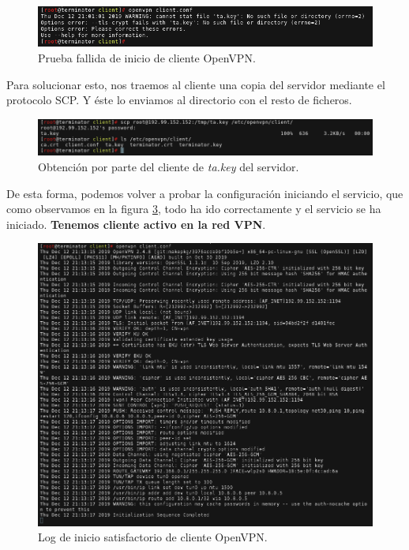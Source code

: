 \documentclass[a4paper, 11pt, titlepage]{article}
\begin{document}
        \begin{figure}[htp]
            \centering
            \includegraphics[width=1\textwidth]{resources/openvpn12.png}
            \caption{Prueba fallida de inicio de cliente OpenVPN.}
            \label{openvpn12}
        \end{figure}   

        Para solucionar esto, nos traemos al cliente una copia del servidor mediante el protocolo
        SCP. Y éste lo enviamos al directorio con el resto de ficheros.

        \begin{figure}[htp]
            \centering
            \includegraphics[width=1\textwidth]{resources/openvpn13.png}
            \caption{Obtención por parte del cliente de \textit{ta.key} del servidor.}
            \label{}
        \end{figure}   

        De esta forma, podemos volver a probar la configuración iniciando el servicio, que como
        observamos en la figura \ref{openvpn14}, todo ha ido correctamente y el servicio se ha 
        iniciado. \textbf{Tenemos cliente activo en la red VPN}.

        \begin{figure}[htp]
            \centering
            \includegraphics[width=1\textwidth]{resources/openvpn14.png}
            \caption{Log de inicio satisfactorio de cliente OpenVPN.}
            \label{openvpn14}
        \end{figure}   
\end{document}
